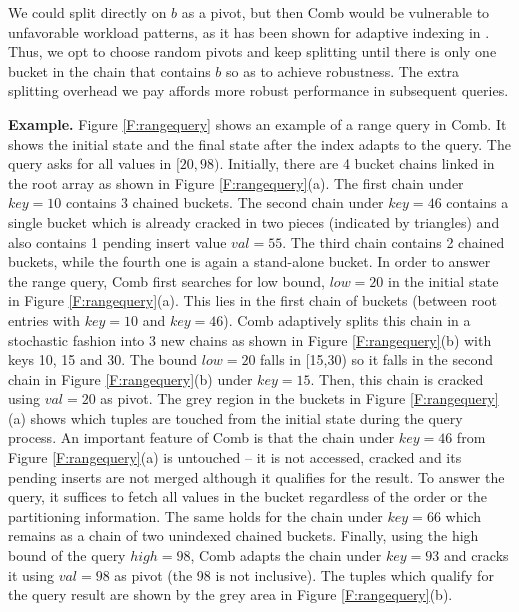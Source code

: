 \documentclass{sig-alternate}
\begin{document}
We could split directly on $b$ as a pivot,
but then Comb would be vulnerable to unfavorable workload patterns, as it has been shown for adaptive indexing in \cite{StochasticCracking}.
Thus, we opt to choose random pivots and keep splitting until there is only one bucket in the
chain that contains $b$ so as to achieve robustness.
The extra splitting overhead we pay affords more robust performance in subsequent queries.


%

%

%

\textbf{Example.}
Figure \ref{F:rangequery} shows an example of a range query in Comb.
It shows the initial state and the final state after the index adapts to the query.
The query asks for all values in $[20,98)$.
Initially, there are 4 bucket chains linked in the root array as shown in Figure \ref{F:rangequery}(a).
The first chain under $key=10$ contains 3 chained buckets.
The second chain under $key=46$ contains a single bucket which is already cracked in two pieces (indicated by triangles)
and also contains 1 pending insert value $val=55$.
The third chain contains 2 chained buckets, while the fourth one is again a stand-alone bucket.
In order to answer the range query, Comb first searches for low bound, $low=20$
in the initial state in Figure \ref{F:rangequery}(a).
This lies in the first chain of buckets (between root entries with $key=10$ and
 $key=46$).
Comb adaptively splits this chain in a stochastic fashion
into 3 new chains as shown in Figure \ref{F:rangequery}(b) with keys 10, 15
and 30. The bound $low=20$ falls in [15,30) so it falls in the second chain in Figure \ref{F:rangequery}(b)
under $key=15$. Then, this chain is cracked using $val=20$ as pivot.
The grey region in the buckets in  Figure \ref{F:rangequery}(a) shows which tuples
are touched from the initial state during the query process.
An important feature of Comb is that
the chain under $key=46$ from Figure \ref{F:rangequery}(a) is untouched --
it is not accessed, cracked and its pending inserts are not merged
although it qualifies for the result.
To answer the query, it suffices
to fetch all values in the bucket regardless of the order or the partitioning information.
The same holds for the chain under $key=66$ which remains as a chain of two unindexed chained buckets.
Finally, using the high bound of the query $high=98$, Comb adapts the chain under $key=93$
and cracks it using $val=98$ as pivot (the 98 is not inclusive).
The tuples which qualify for the query result are shown by the grey area
in  Figure \ref{F:rangequery}(b).
\end{document}
